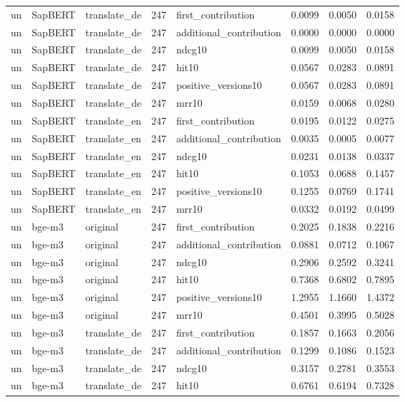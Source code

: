 \begin{tabular}{lllrlrrr}
un & SapBERT & translate\_de & 247 & first\_contribution & 0.0099 & 0.0050 & 0.0158 \\
un & SapBERT & translate\_de & 247 & additional\_contribution & 0.0000 & 0.0000 & 0.0000 \\
un & SapBERT & translate\_de & 247 & ndcg10 & 0.0099 & 0.0050 & 0.0158 \\
un & SapBERT & translate\_de & 247 & hit10 & 0.0567 & 0.0283 & 0.0891 \\
un & SapBERT & translate\_de & 247 & positive\_versions10 & 0.0567 & 0.0283 & 0.0891 \\
un & SapBERT & translate\_de & 247 & mrr10 & 0.0159 & 0.0068 & 0.0280 \\
un & SapBERT & translate\_en & 247 & first\_contribution & 0.0195 & 0.0122 & 0.0275 \\
un & SapBERT & translate\_en & 247 & additional\_contribution & 0.0035 & 0.0005 & 0.0077 \\
un & SapBERT & translate\_en & 247 & ndcg10 & 0.0231 & 0.0138 & 0.0337 \\
un & SapBERT & translate\_en & 247 & hit10 & 0.1053 & 0.0688 & 0.1457 \\
un & SapBERT & translate\_en & 247 & positive\_versions10 & 0.1255 & 0.0769 & 0.1741 \\
un & SapBERT & translate\_en & 247 & mrr10 & 0.0332 & 0.0192 & 0.0499 \\
un & bge-m3 & original & 247 & first\_contribution & 0.2025 & 0.1838 & 0.2216 \\
un & bge-m3 & original & 247 & additional\_contribution & 0.0881 & 0.0712 & 0.1067 \\
un & bge-m3 & original & 247 & ndcg10 & 0.2906 & 0.2592 & 0.3241 \\
un & bge-m3 & original & 247 & hit10 & 0.7368 & 0.6802 & 0.7895 \\
un & bge-m3 & original & 247 & positive\_versions10 & 1.2955 & 1.1660 & 1.4372 \\
un & bge-m3 & original & 247 & mrr10 & 0.4501 & 0.3995 & 0.5028 \\
un & bge-m3 & translate\_de & 247 & first\_contribution & 0.1857 & 0.1663 & 0.2056 \\
un & bge-m3 & translate\_de & 247 & additional\_contribution & 0.1299 & 0.1086 & 0.1523 \\
un & bge-m3 & translate\_de & 247 & ndcg10 & 0.3157 & 0.2781 & 0.3553 \\
un & bge-m3 & translate\_de & 247 & hit10 & 0.6761 & 0.6194 & 0.7328 \\

\end{tabular}
